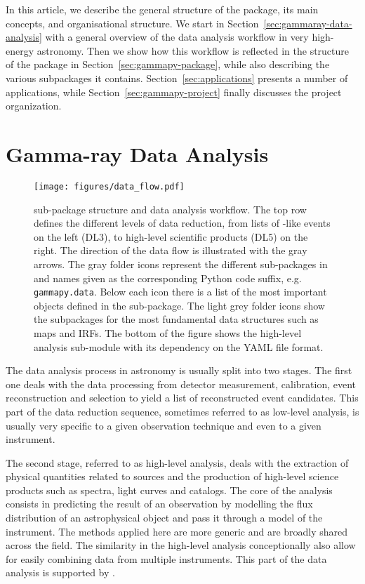 \documentclass[longauth]{aa}
\newcommand{\code}[1]{\texttt{#1}}
\begin{document}
In this article, we describe the general structure of the \gammapy package,
its main concepts, and organisational structure. We start in
Section~\ref{sec:gammaray-data-analysis} with a general overview
of the data analysis workflow in very high-energy \gammaray astronomy. Then we
show how this workflow is reflected in the structure of the \gammapy package 
in Section~\ref{sec:gammapy-package}, while also
describing the various subpackages it contains. Section~\ref{sec:applications}
presents a number of applications, while Section~\ref{sec:gammapy-project}
finally discusses the project organization.


\section{Gamma-ray Data Analysis}
\begin{figure*}[t]
	\centering
	\texttt{[image: figures/data\_flow.pdf]}
	\caption{
		\gammapy sub-package structure and data analysis workflow. The top row
        defines the different levels of data reduction, from lists of \gammaray-like
        events on the left (DL3), to high-level scientific products
        (DL5) on the right. The direction of the data flow is illustrated with the
        gray arrows. The gray folder icons represent the different sub-packages
        in \gammapy and names given as the corresponding Python code suffix, e.g. 
		\code{gammapy.data}. Below each icon there is a list of the most
        important objects defined in the sub-package. The light grey folder
		icons show the subpackages for the most fundamental data structures such 
		as maps and IRFs. The bottom of the figure shows the high-level analysis
		sub-module with its dependency on the YAML file format. 
    }
	\label{fig:data_flow}
\end{figure*}
%
\label{sec:gammaray-data-analysis}
The data analysis process in \gammaray astronomy is usually split into two stages.
The first one deals with the data processing from detector measurement, calibration, event
reconstruction and selection to yield a list of reconstructed \gammaray event candidates.
This part of the data reduction sequence, sometimes referred to as low-level analysis,
is usually very specific to a given observation technique and even to a given instrument.

The second stage, referred to as high-level analysis, deals with the extraction of physical
quantities related to \gammaray sources and the production of high-level science products
such as spectra, light curves and catalogs. The core of the analysis consists in predicting
the result of an observation by modelling the flux distribution of an astrophysical
object and pass it through a model of the instrument. The methods applied here are more
generic and are broadly shared across the field. The similarity in the high-level
analysis conceptionally also allow for easily combining data from multiple instruments.
This part of the data analysis is supported by \gammapy. 
\end{document}
